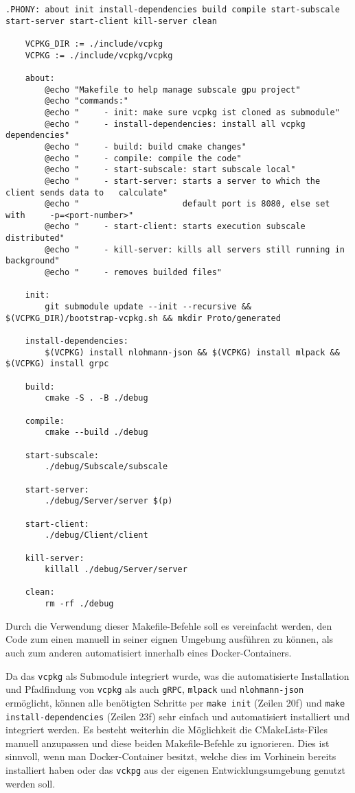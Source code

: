 \begin{lstlisting}[caption=Makefile, label={code:Makefile}, captionpos=b]
    .PHONY: about init install-dependencies build compile start-subscale start-server start-client kill-server clean

    VCPKG_DIR := ./include/vcpkg
    VCPKG := ./include/vcpkg/vcpkg
    
    about:
	    @echo "Makefile to help manage subscale gpu project"
	    @echo "commands:"
	    @echo "     - init: make sure vcpkg ist cloned as submodule"
	    @echo "     - install-dependencies: install all vcpkg dependencies"
	    @echo "     - build: build cmake changes"
	    @echo "     - compile: compile the code"
	    @echo "     - start-subscale: start subscale local"
	    @echo "     - start-server: starts a server to which the client sends data to   calculate"
	    @echo "                     default port is 8080, else set with     -p=<port-number>"
	    @echo "     - start-client: starts execution subscale distributed"
	    @echo "     - kill-server: kills all servers still running in background"
	    @echo "     - removes builded files"
    
    init:
        git submodule update --init --recursive && $(VCPKG_DIR)/bootstrap-vcpkg.sh && mkdir Proto/generated
    
    install-dependencies:
        $(VCPKG) install nlohmann-json && $(VCPKG) install mlpack && $(VCPKG) install grpc
    
    build:
        cmake -S . -B ./debug
    
    compile:
        cmake --build ./debug
    
    start-subscale:
        ./debug/Subscale/subscale
    
    start-server:
        ./debug/Server/server $(p)
    
    start-client:
        ./debug/Client/client
    
    kill-server:
        killall ./debug/Server/server
    
    clean:
        rm -rf ./debug
\end{lstlisting}

Durch die Verwendung dieser Makefile-Befehle soll es vereinfacht werden, den Code zum einen manuell in seiner eignen
Umgebung ausführen zu können, als auch zum anderen automatisiert innerhalb eines Docker-Containers.

Da das \verb|vcpkg| als Submodule integriert wurde, was die automatisierte Installation und Pfadfindung von \verb|vcpkg|
als auch \verb|gRPC|, \verb|mlpack| und \verb|nlohmann-json| ermöglicht, können alle benötigten Schritte per
\verb|make init| (Zeilen 20f) und \verb|make install-dependencies| (Zeilen 23f) sehr einfach und automatisiert
installiert und integriert werden. Es besteht weiterhin die Möglichkeit die CMakeLists-Files manuell anzupassen und
diese beiden Makefile-Befehle zu ignorieren. Dies ist sinnvoll, wenn man Docker-Container besitzt, welche dies im
Vorhinein bereits installiert haben oder das \verb|vckpg| aus der eigenen Entwicklungsumgebung genutzt werden soll.

